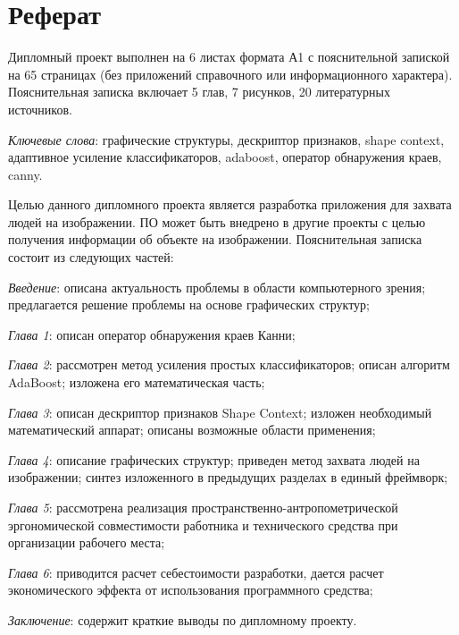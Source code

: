 \section*{Реферат}
\thispagestyle{empty}

Дипломный проект выполнен на 6 листах формата А1 с пояснительной запиской на 65 страницах (без приложений справочного или информационного характера). Пояснительная записка включает 5 глав, 7 рисунков, 20 литературных источников.

\emph{Ключевые слова}: графические структуры, дескриптор признаков, shape context, адаптивное усиление классификаторов, adaboost, оператор обнаружения краев, canny.

Целью данного дипломного проекта является разработка приложения для захвата людей на изображении. ПО может быть внедрено в другие проекты с целью получения информации об объекте на изображении. Пояснительная записка состоит из следующих частей:

\emph{Введение}: описана актуальность проблемы в области компьютерного зрения; предлагается решение проблемы на основе графических структур;

\emph{Глава 1}: описан оператор обнаружения краев Канни;

\emph{Глава 2}: рассмотрен метод усиления простых классификаторов; описан алгоритм AdaBoost; изложена его математическая часть;

\emph{Глава 3}: описан дескриптор признаков Shape Context; изложен необходимый математический аппарат; описаны возможные области применения;

\emph{Глава 4}: описание графических структур; приведен метод захвата людей на изображении; синтез изложенного в предыдущих разделах в единый фреймворк;

\emph{Глава 5}: рассмотрена реализация пространственно\hyp{}антропометрической эргономической совместимости работника и технического средства при организации рабочего места;

\emph{Глава 6}: приводится расчет себестоимости разработки, дается расчет экономического эффекта от использования программного средства;

\emph{Заключение}: содержит краткие выводы по дипломному проекту.

\newpage
